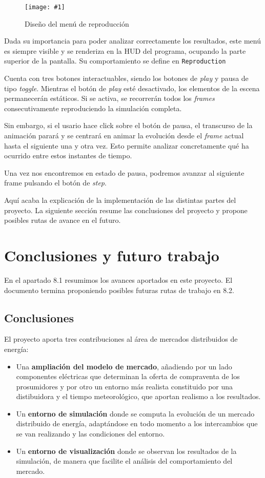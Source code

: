 \documentclass[12pt,a4paper,openright,oneside]{article}
\newcommand{\includeImage}[3]
{
	\begin{figure}[H]
	\begin{center}
	\texttt{[image: \#1]}
	\end{center}
	\caption{#3}
	\end{figure}
}
\numberwithin{equation}{section}
\theoremstyle{definition}
\begin{document}
\begin{itemize}
\includeImage{time.png}{8}{Diseño del menú de reproducción}

Dada su importancia para poder analizar correctamente los resultados, este menú es siempre visible y se renderiza en la HUD del programa, ocupando la parte superior de la pantalla. Su comportamiento se define en \texttt{Reproduction}

Cuenta con tres botones interactuables, siendo los botones de \textit{play} y pausa de tipo \textit{toggle}. Mientras el botón de \textit{play} esté desactivado, los elementos de la escena permanecerán estáticos. Si se activa, se recorrerán todos los \textit{frames} consecutivamente reproduciendo la simulación completa. 

Sin embargo, si el usario hace click sobre el botón de pausa, el transcurso de la animación parará y se centrará en animar la evolución desde el \textit{frame} actual hasta el siguiente una y otra vez. Esto permite analizar concretamente qué ha ocurrido entre estos instantes de tiempo. 

Una vez nos encontremos en estado de pausa, podremos avanzar al siguiente frame pulsando el botón de \textit{step}.
\end{itemize}

\vspace{2cm}
Aquí acaba la explicación de la implementación de las distintas partes del proyecto. La siguiente sección resume las conclusiones del proyecto y propone posibles rutas de avance en el futuro.

\newpage

\section{Conclusiones y futuro trabajo}

En el apartado 8.1 resumimos los avances aportados en este proyecto. El documento termina proponiendo posibles futuras rutas de trabajo en 8.2.

\subsection{Conclusiones}

El proyecto aporta tres contribuciones al área de mercados distribuidos de energía:
\begin{itemize}
\item Una \textbf{ampliación del modelo de mercado}, añadiendo por un lado componentes eléctricas que determinan la oferta de compraventa de los prosumidores y por otro un entorno más realista constituido por una distibuidora y el tiempo meteorológico, que aportan realismo a los resultados.

\item Un \textbf{entorno de simulación} donde se computa la evolución de un mercado distribuido de energía, adaptándose en todo momento a los intercambios que se van realizando y las condiciones del entorno.  
\item Un \textbf{entorno de visualización} donde se observan los resultados de la simulación, de manera que facilite el análisis del comportamiento del mercado.

\end{itemize}
\end{document}
